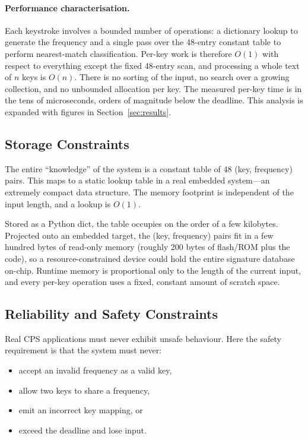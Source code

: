 \documentclass[11pt,a4paper]{article}
\begin{document}
\paragraph{Performance characterisation.}
Each keystroke involves a bounded number of operations: a dictionary lookup to
generate the frequency and a single pass over the 48-entry constant table to
perform nearest-match classification. Per-key work is therefore $O(1)$ with
respect to everything except the fixed 48-entry scan, and processing a whole
text of $n$ keys is $O(n)$. There is no sorting of the input, no search over a
growing collection, and no unbounded allocation per key. The measured per-key
time is in the tens of microseconds, orders of magnitude below the deadline.
This analysis is expanded with figures in Section~\ref{sec:results}.

\subsection{Storage Constraints}

The entire ``knowledge'' of the system is a constant table of 48
(key, frequency) pairs. This maps to a static lookup table in a real embedded
system---an extremely compact data structure. The memory footprint is
independent of the input length, and a lookup is $O(1)$.

Stored as a Python dict, the table occupies on the order of a few kilobytes.
Projected onto an embedded target, the (key, frequency) pairs fit in a few
hundred bytes of read-only memory (roughly 200 bytes of flash/ROM plus the
code), so a resource-constrained device could hold the entire signature
database on-chip. Runtime memory is proportional only to the length of the
current input, and every per-key operation uses a fixed, constant amount of
scratch space.

\subsection{Reliability and Safety Constraints}

Real CPS applications must never exhibit unsafe behaviour. Here the safety
requirement is that the system must never:

\begin{itemize}
    \item accept an invalid frequency as a valid key,
    \item allow two keys to share a frequency,
    \item emit an incorrect key mapping, or
    \item exceed the deadline and lose input.
\end{itemize}
\end{document}
